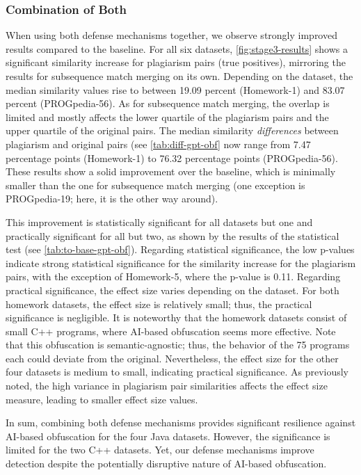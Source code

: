 \subsubsection{Combination of Both}
When using both defense mechanisms together, we observe strongly improved results compared to the baseline.
For all six datasets, \autoref{fig:stage3-results} shows a significant similarity increase for plagiarism pairs (true positives), mirroring the results for subsequence match merging on its own.
Depending on the dataset, the median similarity values rise to between 19.09 percent (Homework-1) and 83.07 percent (PROGpedia-56).
As for subsequence match merging, the overlap is limited and mostly affects the lower quartile of the plagiarism pairs and the upper quartile of the original pairs.
The median similarity \textit{differences} between plagiarism and original pairs (see \autoref{tab:diff-gpt-obf} now range from 7.47 percentage points (Homework-1) to 76.32 percentage points (PROGpedia-56).
These results show a solid improvement over the baseline, which is minimally smaller than the one for subsequence match merging (one exception is PROGpedia-19; here, it is the other way around). 

This improvement is statistically significant for all datasets but one and practically significant for all but two, as shown by the results of the statistical test (see \autoref{tab:to-base-gpt-obf}).
Regarding statistical significance, the low p-values indicate strong statistical significance for the similarity increase for the plagiarism pairs, with the exception of Homework-5, where the p-value is 0.11.
Regarding practical significance, the effect size varies depending on the dataset. For both homework datasets, the effect size is relatively small; thus, the practical significance is negligible.
It is noteworthy that the homework datasets consist of small C++ programs, where AI-based obfuscation seems more effective. Note that this obfuscation is semantic-agnostic; thus, the behavior of the 75 programs each could deviate from the original.
Nevertheless, the effect size for the other four datasets is medium to small, indicating practical significance. As previously noted, the high variance in plagiarism pair similarities affects the effect size measure, leading to smaller effect size values.

In sum, combining both defense mechanisms provides significant resilience against AI-based obfuscation for the four Java datasets. However, the significance is limited for the two C++ datasets.
Yet, our defense mechanisms improve detection despite the potentially disruptive nature of AI-based obfuscation.

